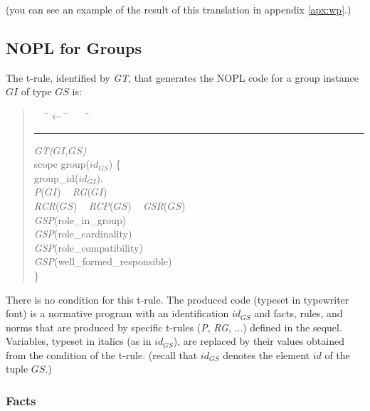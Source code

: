 \documentclass{article}
\newenvironment{rwrule}[2]
{\begin{quote}\ttfamily\begin{tabbing}~~~\=$\leftarrow$ \= ~~~ \= \kill
     \ensuremath{#2}\\
     \rule[2pt]{6.5cm}{.3pt} \hfill \rwlabel{#1}\\}
{\end{tabbing}\end{quote}}
\newcommand{\rwlabel}[1]{{\scshape\itshape\textrm{#1}}}
\theoremstyle{definition} \newtheorem{definition}{Definition}
\begin{document}
(you can see an example of the result of this translation in appendix \ref{apx:wp}.)


\subsection{NOPL for Groups}

The t-rule, identified by \rwlabel{GT}, that generates the NOPL code
for a group instance $GI$ of type $GS$ is:
\begin{rwrule}{GT($GI$,$GS$)}
{ }
scope group($id_{GS}$) \{ \\
   \>  group\_id($id_{GI}$).\\
   \> \rwlabel{P}($GI$) ~ \rwlabel{RG}($GI$)\\
   \> \rwlabel{RCR}($GS$) ~ \rwlabel{RCP}($GS$) ~ \rwlabel{GSR}($GS$)\\
   \> \rwlabel{GSP}(role\_in\_group)\\
   \> \rwlabel{GSP}(role\_cardinality)\\
   \> \rwlabel{GSP}(role\_compatibility)\\
   \> \rwlabel{GSP}(well\_formed\_responsible)\\
\}
\end{rwrule}
There is no  condition for this t-rule. The produced code (typeset in
typewriter font) is a normative program with an identification
$id_{GS}$ and facts, rules, and norms that are produced by specific
t-rules (\rwlabel{P}, \rwlabel{RG}, ...)  defined in the
sequel. Variables, typeset in italics (as in $id_{GS}$), are replaced
by their values obtained from the condition of the t-rule. (recall
that $id_{GS}$ denotes the element $id$ of the tuple $GS$.)

\subsubsection{Facts}
\end{document}
